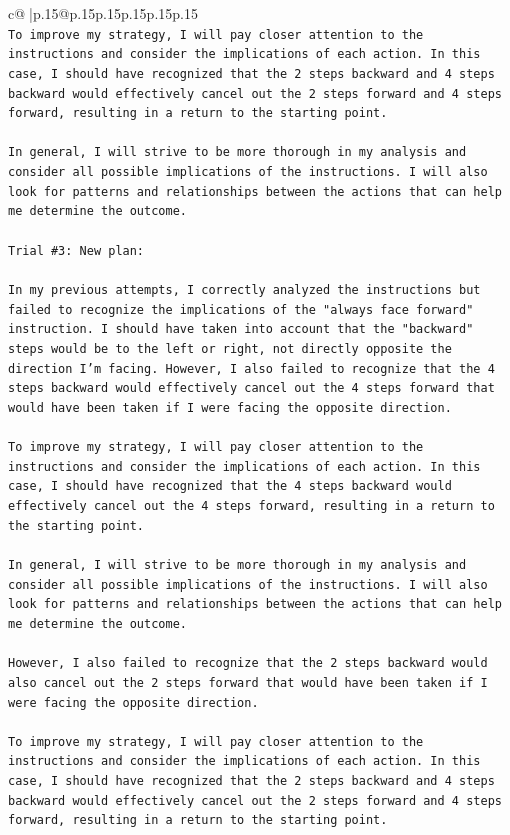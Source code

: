 \documentclass{article}
\begin{document}
{\begin{supertabular}{c@{$\;$}|p{.15\linewidth}@{}p{.15\linewidth}p{.15\linewidth}p{.15\linewidth}p{.15\linewidth}p{.15\linewidth}}
{{{\\ 
\texttt{To improve my strategy, I will pay closer attention to the instructions and consider the implications of each action. In this case, I should have recognized that the 2 steps backward and 4 steps backward would effectively cancel out the 2 steps forward and 4 steps forward, resulting in a return to the starting point. } \\
\\ 
\texttt{In general, I will strive to be more thorough in my analysis and consider all possible implications of the instructions. I will also look for patterns and relationships between the actions that can help me determine the outcome.} \\
\\ 
\texttt{Trial \#3: New plan: } \\
\\ 
\texttt{In my previous attempts, I correctly analyzed the instructions but failed to recognize the implications of the "always face forward" instruction. I should have taken into account that the "backward" steps would be to the left or right, not directly opposite the direction I'm facing. However, I also failed to recognize that the 4 steps backward would effectively cancel out the 4 steps forward that would have been taken if I were facing the opposite direction. } \\
\\ 
\texttt{To improve my strategy, I will pay closer attention to the instructions and consider the implications of each action. In this case, I should have recognized that the 4 steps backward would effectively cancel out the 4 steps forward, resulting in a return to the starting point. } \\
\\ 
\texttt{In general, I will strive to be more thorough in my analysis and consider all possible implications of the instructions. I will also look for patterns and relationships between the actions that can help me determine the outcome. } \\
\\ 
\texttt{However, I also failed to recognize that the 2 steps backward would also cancel out the 2 steps forward that would have been taken if I were facing the opposite direction. } \\
\\ 
\texttt{To improve my strategy, I will pay closer attention to the instructions and consider the implications of each action. In this case, I should have recognized that the 2 steps backward and 4 steps backward would effectively cancel out the 2 steps forward and 4 steps forward, resulting in a return to the starting point. } \\
}}}
\end{supertabular}}
\end{document}
